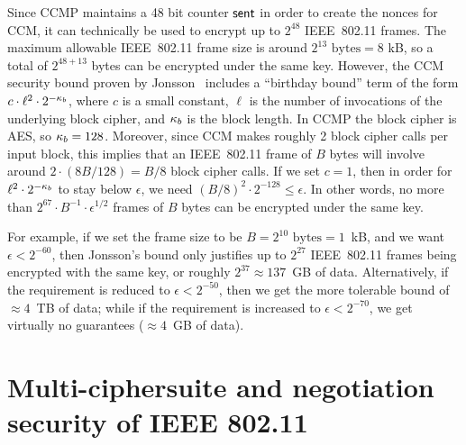 Since CCMP maintains a 48 bit counter $\mathsf{sent}$ in order to create the nonces for CCM,
it can technically be used to encrypt up to $2^{48}$ IEEE~802.11 frames.
The maximum allowable IEEE~802.11 frame size is around $2^{13} \text{ bytes} = 8$ kB,
so a total of $2^{48 + 13}$ bytes can be encrypted under the same key.
However,
the CCM security bound proven by Jonsson~\cite{SAC:Jonsson02} includes a ``birthday bound'' term of the form $c \cdot \ell^2 \cdot 2^{-\kappa_b}$,
where $c$ is a small constant,
$\ell$ is the number of invocations of the underlying block cipher,
and $\kappa_b$ is the block length.
In CCMP the block cipher is AES,
so $\kappa_b = 128$.
Moreover,
since CCM makes roughly 2 block cipher calls per input block,
this implies that an IEEE~802.11 frame of $B$ bytes will involve around  $2 \cdot (8B / 128) = B / 8$ block cipher calls.
If we set $c = 1$,
then in order for $\ell^2 \cdot 2^{-\kappa_b}$ to stay below $\epsilon$,
we need $(B / 8)^2 \cdot 2^{-128} \leq \epsilon$.
In other words,
no more than $2^{67} \cdot B^{-1} \cdot \epsilon^{1/2}$ frames of $B$ bytes can be encrypted under the same key.


For example,
if we set the frame size to be $B = 2^{10} \text{ bytes} = 1$~kB,
and we want $\epsilon < 2^{-60}$,
then Jonsson's bound only justifies up to $2^{27}$  IEEE~802.11 frames being encrypted with the same key,
or roughly $2^{37} \approx 137$~GB of data.
Alternatively,
if the requirement is reduced to $\epsilon < 2^{-50}$,
then we get the more tolerable bound of $\approx 4$~TB of data;
while if the requirement is increased to $\epsilon < 2^{-70}$,
we get virtually no guarantees ($\approx 4$~GB of data).




\section{Multi-ciphersuite and negotiation security of IEEE 802.11}\label{sec:802.11:multi-cipher}

